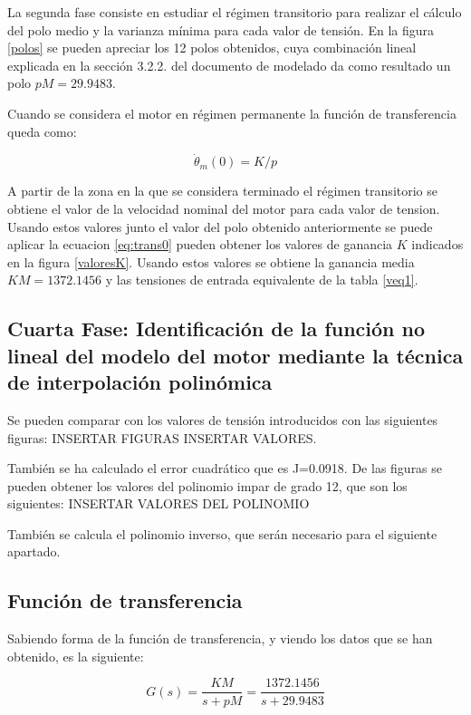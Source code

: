 \documentclass[a4paper]{article}
\begin{document}
La segunda fase consiste en estudiar el régimen transitorio para realizar el cálculo del polo medio y la varianza mínima para cada valor de tensión.
En la figura \ref{polos} se pueden apreciar los 12 polos obtenidos, cuya combinación lineal explicada en la sección 3.2.2. del documento de modelado\cite{modelado}
da como resultado un polo $pM=29.9483$.

Cuando se considera el motor en régimen permanente la función de transferencia queda como:

\begin{equation}
	\label{eq:trans0}
	\dot{\theta}_m (0) = K/p
\end{equation}

A partir de la zona en la que se considera terminado el régimen transitorio se obtiene el valor de la velocidad nominal del motor para cada valor de tension.
Usando estos valores junto el valor del polo obtenido anteriormente se puede aplicar la ecuacion \ref{eq:trans0} pueden obtener los valores de ganancia $K$ indicados en la
figura \ref{valoresK}.
Usando estos valores se obtiene la ganancia media $KM=1372.1456$ y las tensiones de entrada equivalente de la tabla \ref{veq1}.

\subsection{Cuarta Fase: Identificación de la función no lineal del modelo del motor mediante
la técnica de interpolación polinómica}

Se pueden comparar con los valores de tensión introducidos con las siguientes figuras:
INSERTAR FIGURAS INSERTAR VALORES.

También se ha calculado el error cuadrático que es J=0.0918. De las figuras se pueden obtener los valores del polinomio impar de grado 12, que son
los siguientes:
INSERTAR VALORES DEL POLINOMIO

También se calcula el polinomio inverso, que serán necesario para el siguiente apartado.

\subsection{Función de transferencia}
Sabiendo forma de la función de transferencia, y viendo los datos que se han obtenido, es la siguiente:

\begin{equation}
G(s) = \frac{KM}{s+pM} = \frac{1372.1456}{s+29.9483}
\end{equation}
\end{document}

